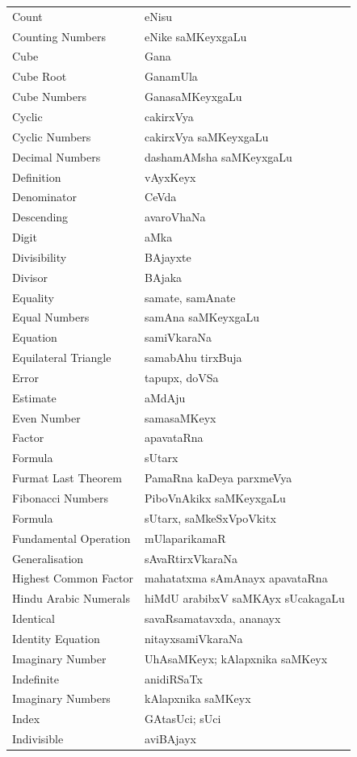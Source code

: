 \begin{longtable}{>{\rm}l@{\hspace{1.25cm}}l}
Count & eNisu\\
Counting Numbers & eNike saMKeyxgaLu\\
Cube & Gana\\
Cube Root & GanamUla\\
Cube Numbers & GanasaMKeyxgaLu\\
Cyclic & cakirxVya\\
Cyclic Numbers & cakirxVya saMKeyxgaLu\\
Decimal Numbers & dashamAMsha saMKeyxgaLu\\
Definition & vAyxKeyx\\
Denominator & CeVda\\
Descending & avaroVhaNa\\
Digit & aMka\\
Divisibility & BAjayxte\\
Divisor & BAjaka\\
Equality & samate, samAnate\\
Equal Numbers & samAna saMKeyxgaLu\\
Equation & samiVkaraNa\\
Equilateral Triangle & samabAhu tirxBuja\\
Error & tapupx, doVSa\\
Estimate & aMdAju\\
Even Number & samasaMKeyx\\
Factor & apavataRna\\
Formula & sUtarx\\
Furmat Last Theorem & PamaRna kaDeya parxmeVya\\
Fibonacci Numbers & PiboVnAkikx saMKeyxgaLu\\
Formula & sUtarx, saMkeSxVpoVkitx\\
Fundamental Operation & mUlaparikamaR\\
Generalisation & sAvaRtirxVkaraNa\\
Highest Common Factor & mahatatxma sAmAnayx apavataRna\\
Hindu Arabic Numerals & hiMdU arabibxV saMKAyx sUcakagaLu\\
Identical & savaRsamatavxda, ananayx\\
Identity Equation & nitayxsamiVkaraNa\\
Imaginary Number & UhAsaMKeyx; kAlapxnika saMKeyx\\
Indefinite & anidiRSaTx\\
Imaginary Numbers & kAlapxnika saMKeyx\\
Index & GAtasUci; sUci\\
Indivisible & aviBAjayx\\

\end{longtable}

